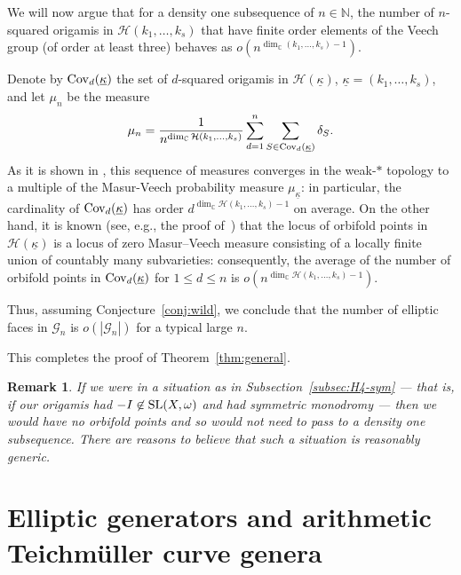 \documentclass[a4paper,11pt]{amsart}
\numberwithin{equation}{section}
\numberwithin{figure}{section}
\numberwithin{table}{section}
\newtheorem{remark}[theorem]{Remark}
\newcommand{\teichmuller}{Teichm{\"u}ller }
\newcommand{\calH}{\mathcal{H}}
\newcommand{\C}{\mathbb{C}}
\newcommand{\N}{\mathbb{N}}
\DeclareMathOperator{\SL}{{\rm{SL}}}
\begin{document}
We will now argue that for a density one subsequence of $n\in\N$, the number of $n$-squared origamis in $\calH(k_1,\dots,k_s)$ that have finite order elements of the Veech group (of order at least three) behaves as $o(n^{\dim_\C(k_1,\dots,k_s) - 1})$.

Denote by ${\rm Cov}_d(\underline{\kappa})$ the set of $d$-squared origamis in $\calH(\underline{\kappa})$, $\underline{\kappa}=(k_1,\dots,k_s)$, and let $\mu_n$ be the measure 
$$\mu_n=\frac{1}{n^{\dim_\C\calH(k_1,\ldots,k_s)}}\sum\limits_{d=1}^n \sum\limits_{S\in {\rm Cov}_d(\underline{\kappa})}\delta_S.$$ 
As it is shown in \cite[Section 3]{EsOk}, this sequence of measures converges in the weak-$\ast$ topology to a multiple of the Masur-Veech probability measure $\mu_{\underline{\kappa}}$: in particular, the cardinality of ${\rm Cov}_d(\underline{\kappa})$ has order $d^{\dim_\C\calH(k_1,\ldots,k_s)-1}$ on average. On the other hand, it is known (see, e.g., the proof of~\cite[Theorem 1.1]{Mo}) that the locus of orbifold points in $\calH(\underline{\kappa})$ is a locus of zero Masur--Veech measure consisting of a locally finite union of countably many subvarieties: consequently, the average of the number of orbifold points in ${\rm Cov}_d(\underline{\kappa})$ for $1\leq d\leq n$ is $o(n^{\dim_\C\calH(k_1,\ldots,k_s)-1})$.

Thus, assuming Conjecture~\ref{conj:wild}, we conclude that the number of elliptic faces in $\mathcal{G}_{n}$ is $o(|\mathcal{G}_{n}|)$ for a typical large $n$.

This completes the proof of Theorem~\ref{thm:general}.

\begin{remark}
    If we were in a situation as in Subsection~\ref{subsec:H4-sym} ---  that is, if our origamis had $-I\not\in\SL(X,\omega)$ and had symmetric monodromy --- then we would have no orbifold points and so would not need to pass to a density one subsequence. There are reasons to believe that such a situation is reasonably generic. 
\end{remark}


\section{Elliptic generators and arithmetic \teichmuller curve genera}\label{sec:curve-genus}
\end{document}
